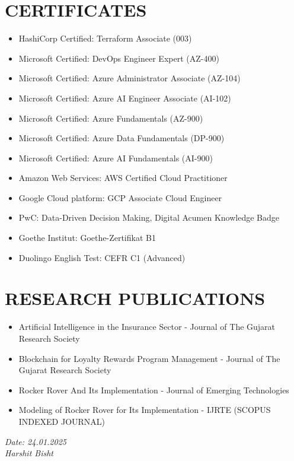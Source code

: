 \documentclass[11pt,a4paper]{article}
\begin{document}
\section*{CERTIFICATES}
\begin{itemize}
    \item HashiCorp Certified: Terraform Associate (003)
    \item Microsoft Certified: DevOps Engineer Expert (AZ-400)
    \item Microsoft Certified: Azure Administrator Associate (AZ-104)
    \item Microsoft Certified: Azure AI Engineer Associate (AI-102)
    \item Microsoft Certified: Azure Fundamentals (AZ-900)
    \item Microsoft Certified: Azure Data Fundamentals (DP-900)
    \item Microsoft Certified: Azure AI Fundamentals (AI-900)
    \item Amazon Web Services: AWS Certified Cloud Practitioner
    \item Google Cloud platform: GCP Associate Cloud Engineer
    \item PwC: Data-Driven Decision Making, Digital Acumen Knowledge Badge
    \item Goethe Institut: Goethe-Zertifikat B1
    \item Duolingo English Test: CEFR C1 (Advanced)
\end{itemize}

\section*{RESEARCH PUBLICATIONS}
\begin{itemize}
    \item Artificial Intelligence in the Insurance Sector - Journal of The Gujarat Research Society
    \item Blockchain for Loyalty Rewards Program Management - Journal of The Gujarat Research Society
    \item Rocker Rover And Its Implementation - Journal of Emerging Technologies
    \item Modeling of Rocker Rover for Its Implementation - IJRTE (SCOPUS INDEXED JOURNAL)
\end{itemize}

\vfill %
\noindent %
\begin{flushright} %
    \textit{Date: 24.01.2025}\\ %
    \textit{Harshit Bisht} %
\end{flushright}
\end{document}

